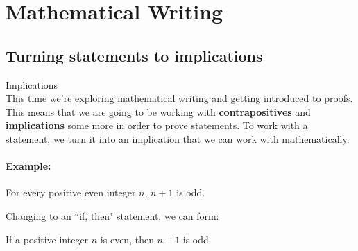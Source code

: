 \documentclass[../Template-Assignment.tex]{subfiles}
\begin{document}
    \section{Mathematical Writing}

    \subsection{Turning statements to implications}

        \begin{intro}{Implications} ~\\
            This time we're exploring mathematical writing and getting introduced
            to proofs. This means that we are going to be working with
            \textbf{contrapositives} and \textbf{implications} some more
            in order to prove statements.
            To work with a statement, we turn it into an implication that
            we can work with mathematically.

            \paragraph{Example:}
            For every positive even integer $n$, $n+1$ is odd.

            Changing to an ``if, then" statement, we can form:

            If a positive integer $n$ is even, then $n+1$ is odd.
        \end{intro}
\end{document}
